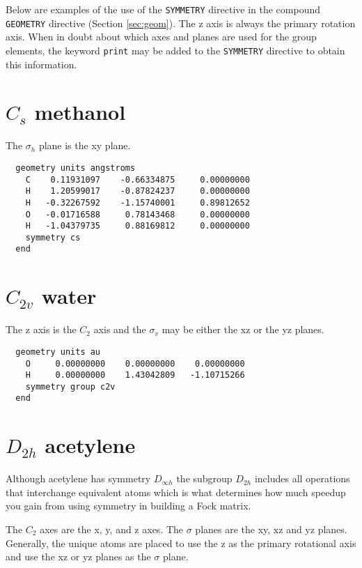 %
%
\label{symexamples}

Below are examples of the use of the \verb+SYMMETRY+ directive in
the compound \verb+GEOMETRY+ directive (Section \ref{sec:geom}).
The z axis is always the primary rotation axis.
When in doubt about which axes and planes are used for the group
elements, the keyword \verb+print+ may be added to the \verb+SYMMETRY+ 
directive to obtain this information.

  \section{\protect$C_{s}$ methanol}

The $\sigma_h$ plane is the xy plane.

\begin{verbatim}
  geometry units angstroms
    C    0.11931097    -0.66334875     0.00000000
    H    1.20599017    -0.87824237     0.00000000
    H   -0.32267592    -1.15740001     0.89812652
    O   -0.01716588     0.78143468     0.00000000
    H   -1.04379735     0.88169812     0.00000000
    symmetry cs
  end
\end{verbatim}

  \section{\protect$C_{2v}$ water}

The z axis is the $C_2$ axis and the $\sigma_v$ may be either the xz or the
yz planes.

\begin{verbatim}
  geometry units au
    O     0.00000000    0.00000000    0.00000000
    H     0.00000000    1.43042809   -1.10715266
    symmetry group c2v
  end
\end{verbatim}

  \section{\protect$D_{2h}$ acetylene}

Although acetylene has symmetry $D_{\infty h}$ the subgroup
$D_{2h}$ includes all operations that interchange equivalent atoms
which is what determines how much speedup you gain from using symmetry
in building a Fock matrix.

The $C_2$ axes are the x, y, and z axes.  The $\sigma$ planes are the xy,
xz and yz planes.  Generally, the unique atoms are placed to use the z
as the primary rotational axis and use the xz or yz planes as the $\sigma$ 
plane.

